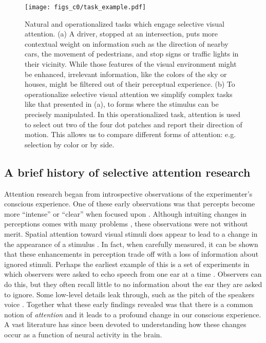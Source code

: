 \begin{figure}[ht]
\centering
\texttt{[image: figs\_c0/task\_example.pdf]}
\caption[Selective visual attention tasks]{Natural and operationalized tasks which engage selective visual attention. (a) A driver, stopped at an intersection, puts more contextual weight on information such as the direction of nearby cars, the movement of pedestrians, and stop signs or traffic lights in their vicinity. While those features of the visual environment might be enhanced, irrelevant information, like the colors of the sky or houses, might be filtered out of their perceptual experience. (b) To operationalize selective visual attention we simplify complex tasks like that presented in (a), to forms where the stimulus can be precisely manipulated. In this operationalized task, attention is used to select out two of the four dot patches and report their direction of motion. This allows us to compare different forms of attention: e.g. selection by color or by side.}
\label{fig:c0f1}
\end{figure}

\subsection{A brief history of selective attention research}

Attention research began from introspective observations of the experimenter's conscious experience. One of these early observations was that percepts become more ``intense'' or ``clear'' when focused upon \citep{Helmholtz1924-rl,James1981-cj,Kuelpe1902-qz,Titchener1908-bx}. Although intuiting changes in perceptions comes with many problems \citep{Helmholtz1924-rl}, these observations were not without merit. Spatial attention toward visual stimuli does appear to lead to a change in the appearance of a stimulus \citep{Carrasco2018-sb}. In fact, when carefully measured, it can be shown that these enhancements in perception trade off with a loss of information about ignored stimuli. Perhaps the earliest example of this is a set of experiments in which observers were asked to echo speech from one ear at a time \citep{Cherry1953-as}. Observers can do this, but they often recall little to no information about the ear they are asked to ignore. Some low-level details leak through, such as the pitch of the speakers voice \citep{Cherry1953-as}. Together what these early findings revealed was that there is a common notion of \textit{attention} and it leads to a profound change in our conscious experience. A vast literature has since been devoted to understanding how these changes occur as a function of neural activity in the brain. 

